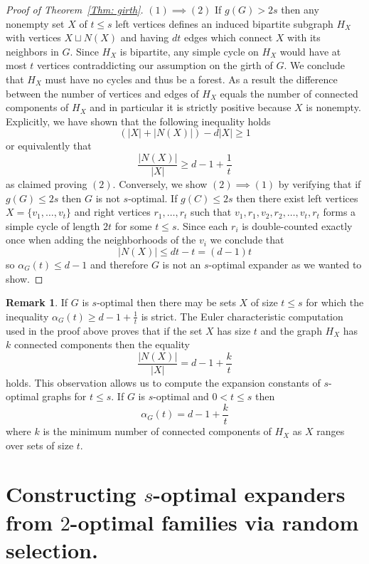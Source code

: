 \documentclass[12pt]{amsart}
\theoremstyle{definition}
\newtheorem{remark}[lemma]{Remark}
\renewcommand{\geq}{\geqslant}
\renewcommand{\leq}{\leqslant}
\newcommand{\1}{\ensuremath{\mathbb{1}}}
\begin{document}
\begin{proof}[Proof of Theorem~\ref{Thm: girth}]
$(1)\implies (2)$ If $g(G)>2s$ then any nonempty set $X$ of $t\leq s$ left vertices defines an induced bipartite subgraph $H_X$ with vertices $X\sqcup N(X)$ and having $dt$ edges which connect $X$ with its neighbors in $G$. Since $H_X$ is bipartite, any simple cycle on $H_X$ would have at most $t$ vertices contraddicting our assumption on the girth of $G$. We conclude that $H_X$ must have no cycles and thus be a forest. As a result the difference between the number of vertices and edges of $H_X$ equals the number of connected components of $H_X$ and in particular it is strictly positive because $X$ is nonempty. Explicitly, we have shown that the following inequality holds
\[\left(|X|+|N(X)|\right)-d|X|\geq 1\]
or equivalently that 
\[\frac{|N(X)|}{|X|}\geq d-1+\frac{1}{t}\]
as claimed proving $(2)$. Conversely, we show $(2)\implies (1)$ by verifying that if $g(G)\leq 2s$ then $G$ is not $s$-optimal. If $g(C)\leq 2s$ then there exist left vertices $X=\{v_1,\dots, v_t\}$ and right vertices $r_1,\dots, r_t$ such that $v_1,r_1,v_2,r_2,\dots, v_t,r_t$ forms a simple cycle of length $2t$ for some $t\leq s$. Since each $r_i$ is double-counted exactly once when adding the neighborhoods of the $v_i$ we conclude that 
\[|N(X)|\leq dt-t=(d-1)t\]
so $\alpha_G(t)\leq d-1$ and therefore $G$ is not an $s$-optimal expander as we wanted to show.
\end{proof}


\begin{remark} If $G$ is $s$-optimal then there may be sets $X$ of size $t\leq s$ for which the inequality $\alpha_G(t)\geq d-1+\frac{1}{t}$ is strict. The Euler characteristic computation used in the proof above proves that if the set $X$ has size $t$ and the graph $H_X$ has $k$ connected components then the equality
\[\frac{|N(X)|}{|X|} = d-1+\frac{k}{t}\]
holds. This observation allows us to compute the expansion constants of $s$-optimal graphs for $t\leq s$. If $G$ is $s$-optimal and $0<t\leq s$ then 
\[\alpha_G(t)=d-1+\frac{k}{t}\]
where $k$ is the minimum number of connected components of $H_X$ as $X$ ranges over sets of size $t$.
\end{remark}

\section{Constructing \texorpdfstring{$s$-optimal}{s-optimal} expanders from \texorpdfstring{$2$-optimal}{2-optimal} families via random selection.}
\end{document}
